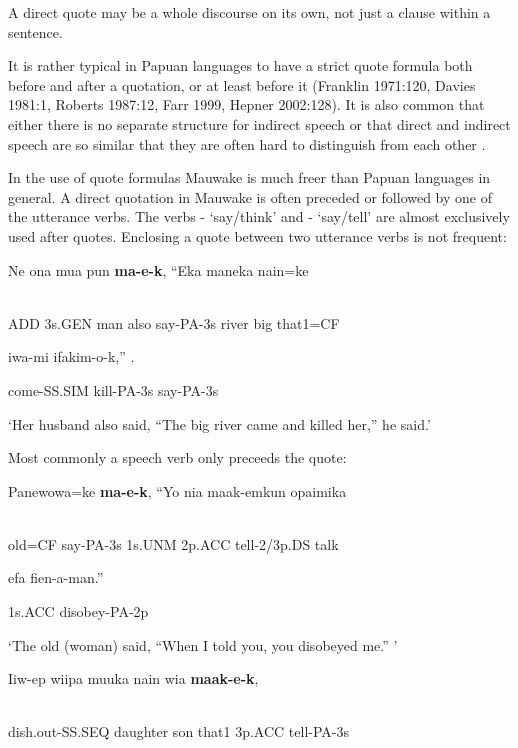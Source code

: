 A direct quote may be a whole discourse on its own, not just a clause within a sentence.

It is rather typical in Papuan languages to have a strict quote formula both before and after a quotation, or at least before it (Franklin 1971:120, Davies 1981:1, Roberts 1987:12, Farr 1999, Hepner 2002:128). It is also common that either there is no separate structure for indirect speech \citep[2]{Davies1981} or that direct and indirect speech are so similar that they are often hard to distinguish from each other \citep[14]{Roberts1987}. 

In the use of quote formulas Mauwake is much freer than Papuan languages in general. A direct quotation in Mauwake is often preceded or followed by one of the utterance verbs. The verbs - `say/think' and - `say/tell' are almost exclusively used after quotes. Enclosing a quote between two utterance verbs is not frequent:

\ea%
\label{ex:x1571}
\gll Ne  ona  mua  pun  \textbf{ma-e-k},  ``Eka  maneka  nain=ke \\
      \\
\glt
\z

ADD  3s.GEN  man  also  say-PA-3s  river  big  that1=CF

iwa-mi  ifakim-o-k,''  .

come-SS.SIM  kill-PA-3s  say-PA-3s

`Her husband also said, ``The big river came and killed her,'' he said.'

Most commonly a speech verb only preceeds the quote:

\ea%
\label{ex:x1578}
\gll Panewowa=ke  \textbf{ma-e-k},  ``Yo  nia  maak-emkun  opaimika \\
      \\
\glt
\z

old=CF  say-PA-3s  1s.UNM  2p.ACC  tell-2/3p.DS  talk

efa  fien-a-man.''

1s.ACC  disobey-PA-2p

`The old (woman) said, ``When I told you, you disobeyed me.'' '

\ea%
\label{ex:x1579}
\gll Iiw-ep  wiipa  muuka  nain  wia  \textbf{maak-e-k}, \\
      \\
\glt
\z

dish.out-SS.SEQ  daughter  son  that1  3p.ACC  tell-PA-3s

